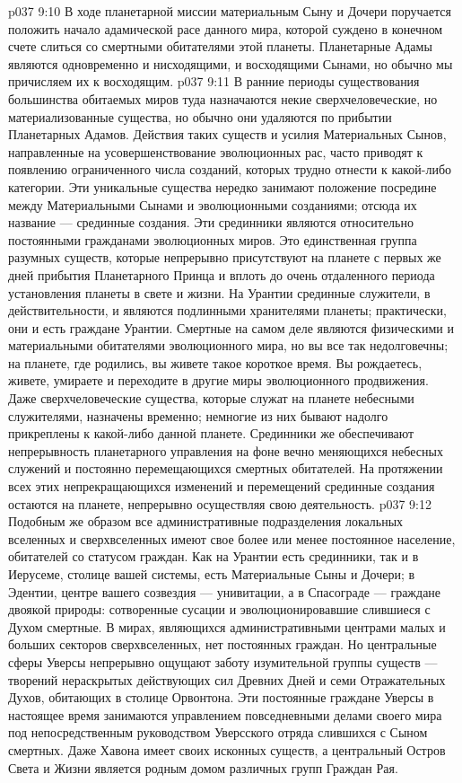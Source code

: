 \vs p037 9:10 В ходе планетарной миссии материальным Сыну и Дочери поручается положить начало адамической расе данного мира, которой суждено в конечном счете слиться со смертными обитателями этой планеты. Планетарные Адамы являются одновременно и нисходящими, и восходящими Сынами, но обычно мы причисляем их к восходящим.
\vs p037 9:11 \pc {} В ранние периоды существования большинства обитаемых миров туда назначаются некие сверхчеловеческие, но материализованные существа, но обычно они удаляются по прибытии Планетарных Адамов. Действия таких существ и усилия Материальных Сынов, направленные на усовершенствование эволюционных рас, часто приводят к появлению ограниченного числа созданий, которых трудно отнести к какой\hyp{}либо категории. Эти уникальные существа нередко занимают положение посредине между Материальными Сынами и эволюционными созданиями; отсюда их название --- срединные создания. Эти срединники являются относительно постоянными гражданами эволюционных миров. Это единственная группа разумных существ, которые непрерывно присутствуют на планете с первых же дней прибытия Планетарного Принца и вплоть до очень отдаленного периода установления планеты в свете и жизни. На Урантии срединные служители, в действительности, и являются подлинными хранителями планеты; практически, они и есть граждане Урантии. Смертные на самом деле являются физическими и материальными обитателями эволюционного мира, но вы все так недолговечны; на планете, где родились, вы живете такое короткое время. Вы рождаетесь, живете, умираете и переходите в другие миры эволюционного продвижения. Даже сверхчеловеческие существа, которые служат на планете небесными служителями, назначены временно; немногие из них бывают надолго прикреплены к какой\hyp{}либо данной планете. Срединники же обеспечивают непрерывность планетарного управления на фоне вечно меняющихся небесных служений и постоянно перемещающихся смертных обитателей. На протяжении всех этих непрекращающихся изменений и перемещений срединные создания остаются на планете, непрерывно осуществляя свою деятельность.
\vs p037 9:12 \pc Подобным же образом все административные подразделения локальных вселенных и сверхвселенных имеют свое более или менее постоянное население, обитателей со статусом граждан. Как на Урантии есть срединники, так и в Иерусеме, столице вашей системы, есть Материальные Сыны и Дочери; в Эдентии, центре вашего созвездия --- унивитации, а в Спасограде --- граждане двоякой природы: сотворенные сусации и эволюционировавшие слившиеся с Духом смертные. В мирах, являющихся административными центрами малых и больших секторов сверхвселенных, нет постоянных граждан. Но центральные сферы Уверсы непрерывно ощущают заботу изумительной группы существ ---  творений нераскрытых действующих сил Древних Дней и семи Отражательных Духов, обитающих в столице Орвонтона. Эти постоянные граждане Уверсы в настоящее время занимаются управлением повседневными делами своего мира под непосредственным руководством Уверсского отряда слившихся с Сыном смертных. Даже Хавона имеет своих исконных существ, а центральный Остров Света и Жизни является родным домом различных групп Граждан Рая.
